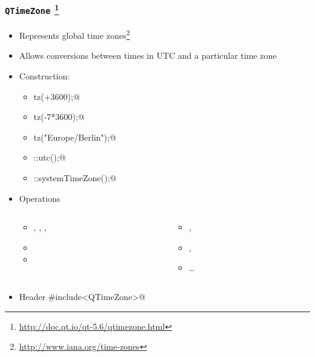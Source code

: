 \begin{frame}[fragile]
  \frametitle{\texttt{QTimeZone}
    \footnote{\url{http://doc.qt.io/qt-5.6/qtimezone.html}}}
  \begin{itemize}
    \item Represents global time zones\footnote
     {\url{http://www.iana.org/time-zones}}
    \item Allows conversions between times in UTC and a particular time zone
    \item Construction:
    \begin{itemize}
      \scriptsize
      \item \verb@QTimeZone tz(+3600);@
      \item \verb@QTimeZone tz(-7*3600);@
      \item \verb@QTimeZone tz("Europe/Berlin");@
      \item \verb@QTimeZone::utc();@
      \item \verb@QTimeZone::systemTimeZone();@
    \end{itemize}
    \item Operations
    \begin{columns}
      \scriptsize
      \begin{column}{0.4\textwidth}
      \begin{itemize}
        \item \verb@id@, \verb@displayName@, \verb@abbreviation@, \verb@comment@
        \item \verb@country@
        \item \verb@availableTimeZoneIds@
      \end{itemize}
      \end{column}
      \begin{column}{0.4\textwidth}
      \begin{itemize}
        \item \verb@offsetFromUtf@, \verb@standardTimeOffset@
        \item \verb@hasDaylightTime@, \verb@hasTransitions@
        \item \ldots
      \end{itemize}
      \end{column}
    \end{columns}
    \item Header \verb@#include<QTimeZone>@
  \end{itemize}
\end{frame}

